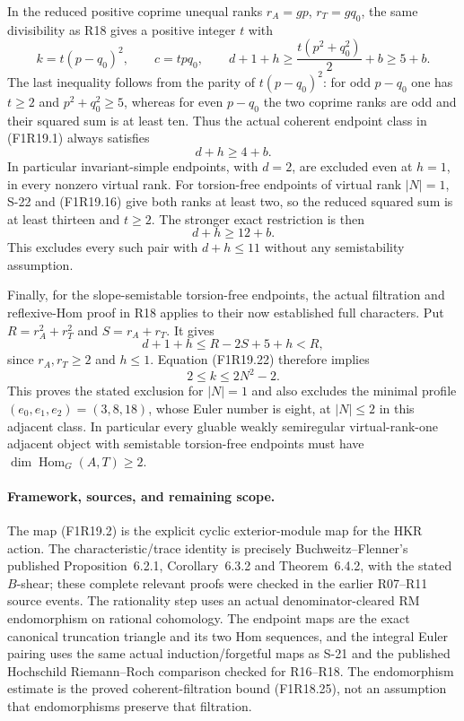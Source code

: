 In the reduced positive coprime unequal ranks
$r_A=gp$, $r_T=gq_0$, the same divisibility as R18
gives a positive integer $t$ with
\[
 k=t(p-q_0)^2,\qquad c=tpq_0,\qquad
 d+1+h\ge\frac{t(p^2+q_0^2)}2+b\ge5+b.
 \tag{F1R19.23}
\]
The last inequality follows from the parity of
$t(p-q_0)^2$: for odd $p-q_0$ one has $t\ge2$ and
$p^2+q_0^2\ge5$, whereas for even $p-q_0$ the two
coprime ranks are odd and their squared sum is at
least ten. Thus the actual coherent endpoint class
in (F1R19.1) always satisfies
\[
                                  d+h\ge4+b.
 \tag{F1R19.24}
\]
In particular invariant-simple endpoints, with $d=2$,
are excluded even at $h=1$, in every nonzero virtual
rank. For torsion-free endpoints of virtual rank
$|N|=1$, S-22 and (F1R19.16) give both ranks at least
two, so the reduced squared sum is at least thirteen
and $t\ge2$. The stronger exact restriction is then
\[
                                  d+h\ge12+b.
 \tag{F1R19.25}
\]
This excludes every such pair with $d+h\le11$ without
any semistability assumption.

Finally, for the slope-semistable torsion-free endpoints,
the actual filtration and reflexive-Hom proof in R18
applies to their now established full characters. Put
$R=r_A^2+r_T^2$ and $S=r_A+r_T$. It gives
\[
                   d+1+h\le R-2S+5+h<R,
 \tag{F1R19.26}
\]
since $r_A,r_T\ge2$ and $h\le1$. Equation
(F1R19.22) therefore implies
\[
                              2\le k\le2N^2-2.
 \tag{F1R19.27}
\]
This proves the stated exclusion for $|N|=1$ and also
excludes the minimal profile $(e_0,e_1,e_2)=(3,8,18)$,
whose Euler number is eight, at $|N|\le2$ in this
adjacent class. In particular every gluable weakly
semiregular virtual-rank-one adjacent object with
semistable torsion-free endpoints must have
$\dim\operatorname{Hom}_G(A,T)\ge2$.

\paragraph{Framework, sources, and remaining scope.}
The map (F1R19.2) is the explicit cyclic exterior-module
map for the HKR action. The characteristic/trace
identity is precisely Buchweitz--Flenner's published
Proposition~6.2.1, Corollary~6.3.2 and Theorem~6.4.2,
with the stated $B$-shear; these complete relevant proofs
were checked in the earlier R07--R11 source events.
The rationality step uses an actual denominator-cleared
RM endomorphism on rational cohomology. The endpoint
maps are the exact canonical truncation triangle and
its two Hom sequences, and the integral Euler pairing
uses the same actual induction/forgetful maps as S-21
and the published Hochschild Riemann--Roch comparison
checked for R16--R18. The endomorphism estimate is the
proved coherent-filtration bound (F1R18.25), not an
assumption that endomorphisms preserve that filtration.

